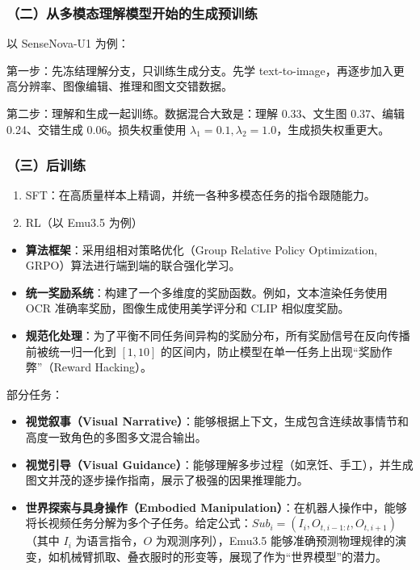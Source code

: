 \hypertarget{ux4e8cux4eceux591aux6a21ux6001ux7406ux89e3ux6a21ux578bux5f00ux59cbux7684ux751fux6210ux9884ux8badux7ec3}{%
\subsubsection{（二）从多模态理解模型开始的生成预训练}\label{ux4e8cux4eceux591aux6a21ux6001ux7406ux89e3ux6a21ux578bux5f00ux59cbux7684ux751fux6210ux9884ux8badux7ec3}}

以 SenseNova-U1 为例：

第一步：先冻结理解分支，只训练生成分支。先学 text-to-image，再逐步加入更高分辨率、图像编辑、推理和图文交错数据。

第二步：理解和生成一起训练。数据混合大致是：理解 0.33、文生图 0.37、编辑 0.24、交错生成 0.06。损失权重使用 \(\lambda_1=0.1,\lambda_2=1.0\)，生成损失权重更大。

\hypertarget{ux4e09ux540eux8badux7ec3}{%
\subsubsection{（三）后训练}\label{ux4e09ux540eux8badux7ec3}}

\begin{enumerate}
\def\labelenumi{\arabic{enumi}.}
\item
  SFT：在高质量样本上精调，并统一各种多模态任务的指令跟随能力。
\item
  RL（以 Emu3.5 为例）
\end{enumerate}

\begin{itemize}
\tightlist
\item
  \textbf{算法框架}：采用组相对策略优化（Group Relative Policy Optimization, GRPO）算法进行端到端的联合强化学习。
\item
  \textbf{统一奖励系统}：构建了一个多维度的奖励函数。例如，文本渲染任务使用 OCR 准确率奖励，图像生成使用美学评分和 CLIP 相似度奖励。
\item
  \textbf{规范化处理}：为了平衡不同任务间异构的奖励分布，所有奖励信号在反向传播前被统一归一化到 \([1,10]\) 的区间内，防止模型在单一任务上出现``奖励作弊''（Reward Hacking）。
\end{itemize}

部分任务：

\begin{itemize}
\tightlist
\item
  \textbf{视觉叙事（Visual Narrative）}：能够根据上下文，生成包含连续故事情节和高度一致角色的多图多文混合输出。
\item
  \textbf{视觉引导（Visual Guidance）}：能够理解多步过程（如烹饪、手工），并生成图文并茂的逐步操作指南，展示了极强的因果推理能力。
\item
  \textbf{世界探索与具身操作（Embodied Manipulation）}：在机器人操作中，能够将长视频任务分解为多个子任务。给定公式：\(Sub_i=(I_i,O_{t,i-1:t},O_{t,i+1})\)（其中 \(I_i\) 为语言指令，\(O\) 为观测序列），Emu3.5 能够准确预测物理规律的演变，如机械臂抓取、叠衣服时的形变等，展现了作为``世界模型''的潜力。
\end{itemize}

